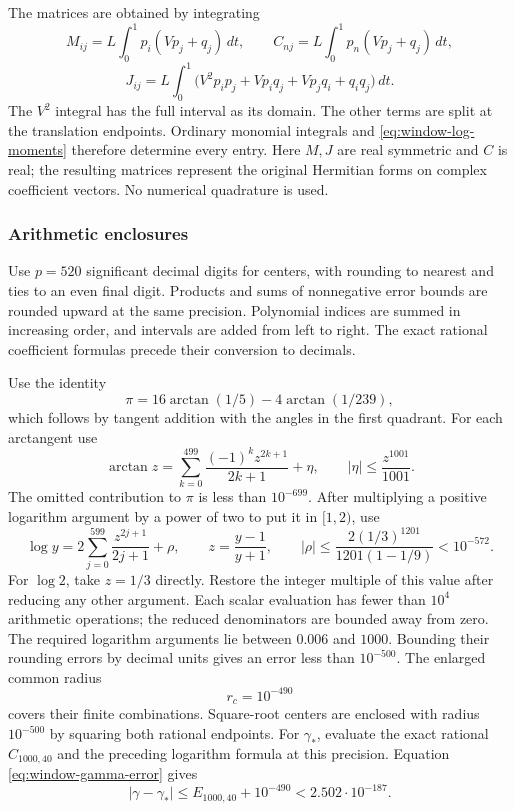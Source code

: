 The matrices are obtained by integrating
\[
 M_{ij}=L\int_0^1p_i(Vp_j+q_j)\,dt,\qquad
 C_{nj}=L\int_0^1p_n(Vp_j+q_j)\,dt,
\]
\begin{equation}
 J_{ij}=L\int_0^1
 \bigl(V^2p_ip_j+Vp_iq_j+Vp_jq_i+q_iq_j\bigr)\,dt.
 \label{eq:window-computation-gram}
\end{equation}
The $V^2$ integral has the full interval as its domain.
The other terms are split at the translation endpoints.
Ordinary monomial integrals and
\eqref{eq:window-log-moments} therefore determine every entry.
Here $M,J$ are real symmetric and $C$ is real; the resulting
matrices represent the original Hermitian forms on complex
coefficient vectors.
No numerical quadrature is used.

\subsubsection{Arithmetic enclosures}

Use $p=520$ significant decimal digits for centers, with rounding
to nearest and ties to an even final digit.  Products and sums
of nonnegative error bounds are rounded upward at the same
precision.  Polynomial indices are summed in increasing order,
and intervals are added from left to right.  The exact rational
coefficient formulas precede their conversion to decimals.

Use the identity
\[
 \pi=16\arctan(1/5)-4\arctan(1/239),
\]
which follows by tangent addition with the angles in the first
quadrant.  For each arctangent use
\[
 \arctan z=\sum_{k=0}^{499}\frac{(-1)^kz^{2k+1}}{2k+1}+\eta,
 \qquad |\eta|\le\frac{z^{1001}}{1001}.
\]
The omitted contribution to $\pi$ is less than $10^{-699}$.
After multiplying a positive logarithm argument
by a power of two to put it in $[1,2)$, use
\[
 \log y=2\sum_{j=0}^{599}\frac{z^{2j+1}}{2j+1}+\rho,
 \qquad z=\frac{y-1}{y+1},\qquad
 |\rho|\le\frac{2(1/3)^{1201}}{1201(1-1/9)}<10^{-572}.
\]
For $\log2$, take $z=1/3$ directly.  Restore the integer
multiple of this value after reducing any other argument.
Each scalar evaluation has fewer than $10^4$ arithmetic operations;
the reduced denominators are bounded away from zero.  The required
logarithm arguments lie between $0.006$ and $1000$.
Bounding their rounding errors by decimal units gives an error
less than $10^{-500}$.  The enlarged common radius
\[
 r_c=10^{-490}
\]
covers their finite combinations.  Square-root centers are enclosed
with radius $10^{-500}$ by squaring both rational endpoints.
For $\gamma_*$, evaluate the exact rational $C_{1000,40}$ and
the preceding logarithm formula at this precision.  Equation
\eqref{eq:window-gamma-error} gives
\[
 |\gamma-\gamma_*|\le E_{1000,40}+10^{-490}
                  <2.502\cdot10^{-187}.
\]

